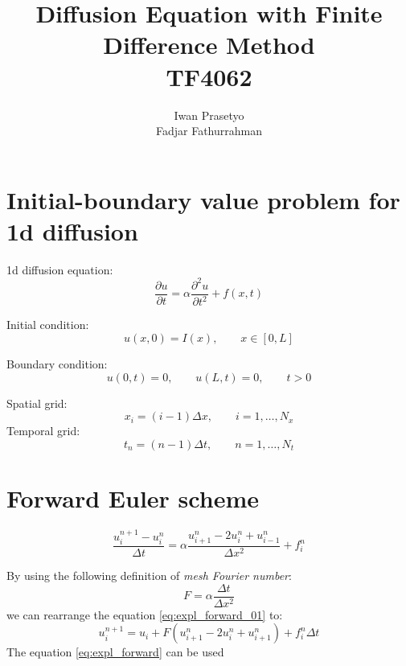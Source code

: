 \documentclass[a4paper,12pt]{article}
\begin{document}
\title{Diffusion Equation with Finite Difference Method \\
TF4062}
\author{Iwan Prasetyo \\
Fadjar Fathurrahman}
\date{}
\maketitle

\section{Initial-boundary value problem for 1d diffusion}

1d diffusion equation:
\begin{equation}
\frac{\partial u}{\partial t} = \alpha \frac{\partial^2 u}{\partial t^2} + f(x,t)
\end{equation}

Initial condition:
\begin{equation}
u(x,0) = I(x), \qquad x \in [0,L]
\end{equation}

Boundary condition:
\begin{equation}
u(0,t) = 0, \qquad u(L,t) = 0, \qquad t > 0
\end{equation}

Spatial grid:
\begin{equation}
x_{i} = (i-1)\Delta x, \qquad i = 1, \ldots, N_{x}
\end{equation}
Temporal grid:
\begin{equation}
t_{n} = (n-1)\Delta t, \qquad n = 1, \ldots, N_{t}
\end{equation}


\section{Forward Euler scheme}

\begin{equation}
\frac{u_{i}^{n+1} - u_{i}^{n}}{\Delta t} = \alpha \frac{u_{i+1}^{n} -2u_{i}^{n} + u_{i-1}^{n}}{\Delta x^2} + f_{i}^{n}
\label{eq:expl_forward_01}
\end{equation}

By using the following definition of \textit{mesh Fourier number}:
\begin{equation}
F = \alpha \frac{\Delta t}{\Delta x^2}
\end{equation}
we can rearrange the equation \eqref{eq:expl_forward_01} to:
\begin{equation}
u_{i}^{n+1} = u_{i} + F\left( u_{i+1}^{n} - 2u_{i}^{n} + u_{i+1}^{n} \right) +
f_{i}^{n}\Delta t
\label{eq:expl_forward}
\end{equation}
The equation \eqref{eq:expl_forward} can be used 
\end{document}
